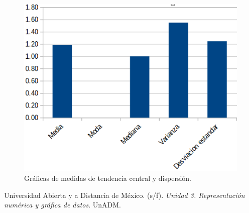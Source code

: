\documentclass[11pt]{article}
\begin{document}
	\begin{figure}[htp]
		\centering
		\includegraphics[width=\textwidth]{assets/graficas-A3-U3.png}
		\caption{Gráficas de medidas de tendencia central y dispersión.}
		\label{graficas}
	\end{figure}




\begin{thebibliography}{X}
	 Universidad Abierta y a Distancia de México. (s/f). \textit{Unidad 3. Representación numérica y gráfica de datos}. UnADM.
 
\end{thebibliography}
\end{document}
